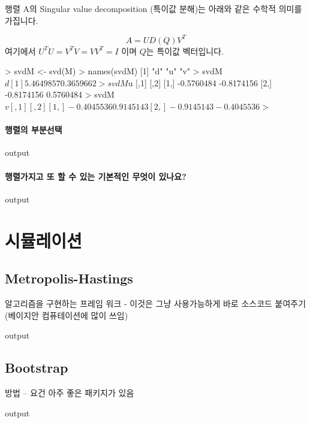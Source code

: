 \documentclass{report}
\begin{document}
행렬 A의 Singular value decomposition (특이값 분해)는 아래와 같은 수학적 의미를 가집니다. 

\begin{equation}
A = U D(Q) V^T
\end{equation}
%
여기에서 $ U^T U = V^T V = VV^T = I $ 이며 $Q$는 특이값 벡터입니다. 

\begin{Schunk}
\begin{Soutput}
> svdM <- svd(M)
> names(svdM)
[1] "d" "u" "v"
> svdM$d
[1] 5.4649857 0.3659662
> svdM$u
           [,1]       [,2]
[1,] -0.5760484 -0.8174156
[2,] -0.8174156  0.5760484
> svdM$v
           [,1]       [,2]
[1,] -0.4045536  0.9145143
[2,] -0.9145143 -0.4045536
> $
\end{Soutput}
\end{Schunk}

\paragraph{행렬의 부분선택}
\begin{Schunk}
\begin{Soutput}
output
\end{Soutput}
\end{Schunk}

\paragraph{행렬가지고 또 할 수 있는 기본적인 무엇이 있나요?}
\begin{Schunk}
\begin{Soutput}
output
\end{Soutput}
\end{Schunk}


\section{시뮬레이션}
\subsection{Metropolis-Hastings} 알고리즘을 구현하는 프레임 워크 - 이것은 그냥 사용가능하게 바로 소스코드 붙여주기 (베이지안 컴퓨테이션에 많이 쓰임)
\begin{Schunk}
\begin{Soutput}
output
\end{Soutput}
\end{Schunk}

\subsection{Bootstrap} 
방법 -- 요건 아주 좋은 패키지가 있음 
\begin{Schunk}
\begin{Soutput}
output
\end{Soutput}
\end{Schunk}
\end{document}
